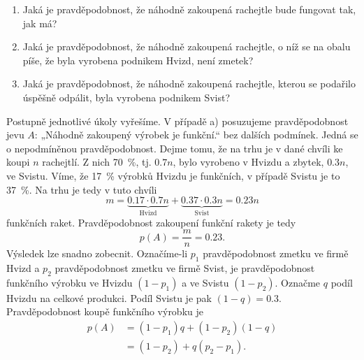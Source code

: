 \begin{mdframed}[style=mdexam]
\begin{example}
      \begin{enumerate}[noitemsep, label=\emph{\alph*}]
        \item Jaká je pravděpodobnost, že náhodně zakoupená rachejtle bude fungovat tak, jak má?
        \item Jaká je pravděpodobnost, že náhodně zakoupená rachejtle, o níž se na obalu píše, že
              byla vyrobena podnikem Hvizd, není zmetek?
        \item Jaká je pravděpodobnost, že náhodně zakoupená rachejtle, kterou se podařilo úspěšně
              odpálit, byla vyrobena podnikem Svist?
      \end{enumerate} 
      Postupně jednotlivé úkoly vyřešíme. V případě a) posuzujeme pravděpodobnost jevu \(A\):
      „Náhodně zakoupený výrobek je funkční.“ bez dalších podmínek. Jedná se o nepodmíněnou
      pravděpodobnost. Dejme tomu, že na trhu je v dané chvíli ke koupi \(n\) rachejtlí. Z nich
      \SI{70}{\percent}, tj. \(\num{0.7}n\), bylo vyrobeno v Hvizdu a zbytek, \(\num{0.3}n\), ve
      Svistu. Víme, že \SI{17}{\percent} výrobků Hvizdu je funkčních, v případě Svistu je to
      \SI{37}{\percent}. Na trhu je tedy v tuto chvíli
      \begin{equation*}
        m = \underbrace{\num{0.17}\cdot\num{0.7}n}_\text{Hvizd} + 
            \underbrace{\num{0.37}\cdot\num{0.3}n}_\text{Svist} = \num{0.23}n
      \end{equation*}
      funkčních raket. Pravděpodobnost zakoupení funkční rakety je tedy
      \begin{equation*}
        p(A) = \dfrac{m}{n} = \num{0.23}.
      \end{equation*}
      Výsledek lze snadno zobecnit. Označíme-li \(p_1\) pravděpodobnost zmetku ve firmě Hvizd a
      \(p_2\) pravděpodobnost zmetku ve firmě Svist, je pravděpodobnost funkčního výrobku ve Hvizdu
      \((1 - p_1)\) a ve Svistu \((1 - p_2)\). Označme \(q\) podíl Hvizdu na celkové produkci. Podíl
      Svistu je pak \((1 - q)=\num{0.3}\). Pravděpodobnost koupě funkčního výrobku je
      \begin{align*}
        p(A) &= (1 - p_1)q + (1 - p_2)(1 - q)    \\
             &= (1 - p_2) + q(p_2 - p_1).
      \end{align*}
      

\end{example}
\end{mdframed}
